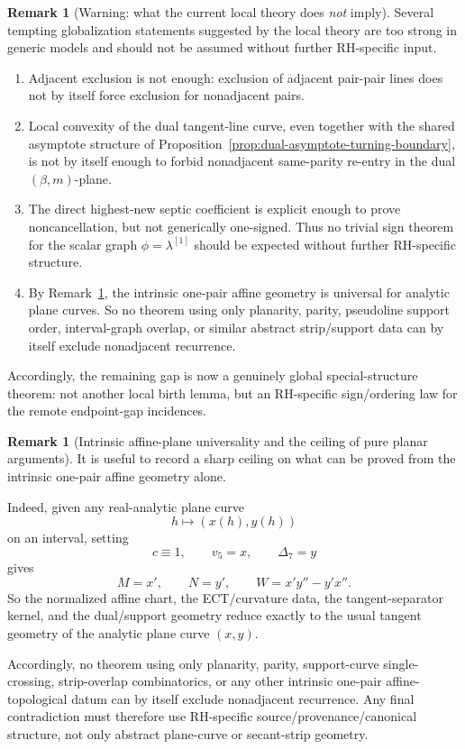 \documentclass[11pt,a4paper]{amsart}
\theoremstyle{plain}
\theoremstyle{definition}
\newtheorem{remark}[theorem]{Remark}
\begin{document}
\begin{remark}[Warning: what the current local theory does \emph{not} imply]
\label{rem:warning-no-easy-globalization}
Several tempting globalization statements suggested by the local theory are too
strong in generic models and should not be assumed without further RH-specific
input.

\begin{enumerate}
\item Adjacent exclusion is not enough: exclusion of adjacent pair-pair lines
does not by itself force exclusion for nonadjacent pairs.

\item Local convexity of the dual tangent-line curve, even together with the
shared asymptote structure of
Proposition~\ref{prop:dual-asymptote-turning-boundary}, is not by itself enough
to forbid nonadjacent same-parity re-entry in the dual $(\beta,m)$-plane.

\item The direct highest-new septic coefficient is explicit enough to prove
noncancellation, but not generically one-signed. Thus no trivial sign theorem
for the scalar graph $\phi=\lambda^{[1]}$ should be expected without further
RH-specific structure.

\item By Remark~\ref{rem:intrinsic-affine-plane-universality}, the intrinsic
one-pair affine geometry is universal for analytic plane curves. So no theorem
using only planarity, parity, pseudoline support order, interval-graph overlap,
or similar abstract strip/support data can by itself exclude nonadjacent
recurrence.
\end{enumerate}

Accordingly, the remaining gap is now a genuinely global special-structure
theorem: not another local birth lemma, but an RH-specific sign/ordering law
for the remote endpoint-gap incidences.
\end{remark}

\begin{remark}[Intrinsic affine-plane universality and the ceiling of pure planar arguments]
\label{rem:intrinsic-affine-plane-universality}
It is useful to record a sharp ceiling on what can be proved from the intrinsic
one-pair affine geometry alone.

Indeed, given any real-analytic plane curve
\[
h\longmapsto (x(h),y(h))
\]
on an interval, setting
\[
c\equiv 1,
\qquad
v_5=x,
\qquad
\Delta_7=y
\]
gives
\[
M=x',
\qquad
N=y',
\qquad
W=x'y''-y'x''.
\]
So the normalized affine chart, the ECT/curvature data, the tangent-separator
kernel, and the dual/support geometry reduce exactly to the usual tangent
geometry of the analytic plane curve $(x,y)$.

Accordingly, no theorem using only planarity, parity, support-curve
single-crossing, strip-overlap combinatorics, or any other intrinsic one-pair
affine-topological datum can by itself exclude nonadjacent recurrence. Any
final contradiction must therefore use RH-specific source/provenance/canonical
structure, not only abstract plane-curve or secant-strip geometry.
\end{remark}
\end{document}
